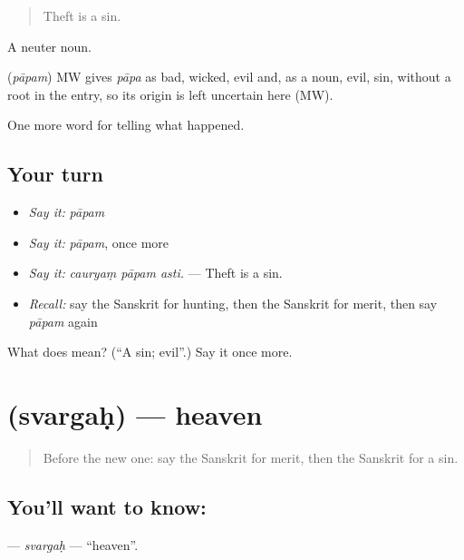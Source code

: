 \begin{quote}
Theft is a sin.
\end{quote}

A neuter noun.

\begin{cousinweb}
\textbf{} (\emph{pāpam}) MW gives \emph{pāpa} as bad, wicked, evil and, as a noun, evil, sin, without a root in the entry, so its origin is left uncertain here (MW).
\end{cousinweb}

\begin{grammarlens}[title={What you've built}]
One more word for telling what happened.
\end{grammarlens}

\subsection*{Your turn}
\begin{itemize}
\raggedright
  \item \emph{Say it:} \emph{pāpam}
  \item \emph{Say it:} \emph{pāpam}, once more
  \item \emph{Say it:} \emph{cauryaṃ pāpam asti.} — Theft is a sin.
  \item \emph{Recall:} say the Sanskrit for hunting, then the Sanskrit for merit, then say \emph{pāpam} again
\end{itemize}

\begin{tcolorbox}[breakable,colback=teal!4,colframe=teal!35!black,title={Before you move on}]
What does  mean? (\textquotedblleft{}A sin; evil\textquotedblright{}.) Say it once more.
\end{tcolorbox}
\section[\texorpdfstring{\sk{स्वर्गः} (svargaḥ)}{स्वर्गः (svargaḥ)}]{ (svargaḥ) — heaven}

\label{lesson:SA-C338-svargah}



\begin{quote}
Before the new one: say the Sanskrit for merit, then the Sanskrit for a sin.
\end{quote}

\subsection*{You'll want to know: }
\textbf{} — \emph{svargaḥ} — \textquotedblleft{}heaven\textquotedblright{}.

